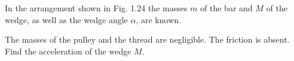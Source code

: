 \item In the arrangement shown in Fig. 1.24 the masses \( m \) of the bar and \( M \) of the wedge, as well as the wedge angle \(\alpha\), are known.
    \begin{center}
    \end{center}
The masses of the pulley and the thread are negligible. The friction is absent. Find the acceleration of the wedge \( M \).